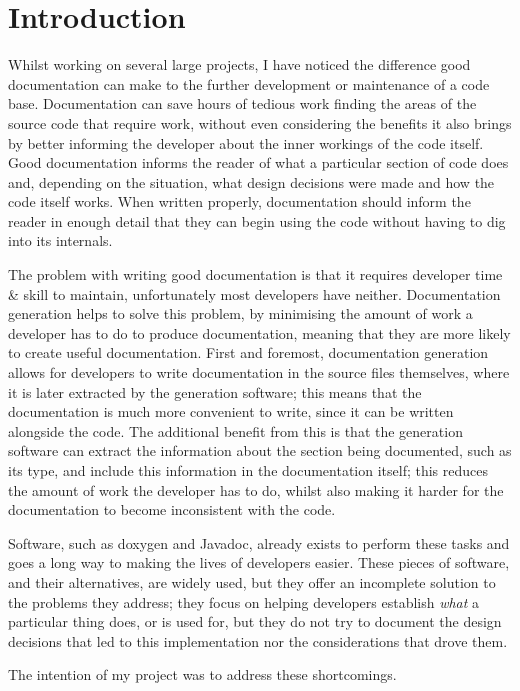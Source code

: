 
\chapter{Introduction}
Whilst working on several large projects, I have noticed the difference good
documentation can make to the further development or maintenance of a code base.
Documentation can save hours of tedious work finding the areas of the source
code that require work, without even considering the benefits it also brings by
better informing the developer about the inner workings of the code itself. Good
documentation informs the reader of what a particular section of code does and,
depending on the situation, what design decisions were made and how the code
itself works. When written properly, documentation should inform the reader in
enough detail that they can begin using the code without having to dig into its
internals.

The problem with writing good documentation is that it requires developer time
\& skill to maintain, unfortunately most developers have neither. Documentation
generation helps to solve this problem, by minimising the amount of work a
developer has to do to produce documentation, meaning that they are more likely
to create useful documentation. First and foremost, documentation generation
allows for developers to write documentation in the source files themselves,
where it is later extracted by the generation software; this means that the
documentation is much more convenient to write, since it can be written
alongside the code. The additional benefit from this is that the generation
software can extract the information about the section being documented, such as
its type, and include this information in the documentation itself; this reduces
the amount of work the developer has to do, whilst also making it harder for the
documentation to become inconsistent with the code.

Software, such as doxygen\cite{website:doxygen} and
Javadoc\cite{website:javadoc}, already exists to perform these tasks and goes a
long way to making the lives of developers easier. These pieces of software, and
their alternatives, are widely used, but they offer an incomplete solution to
the problems they address; they focus on helping developers establish
\emph{what} a particular thing does, or is used for, but they do not try to
document the design decisions that led to this implementation nor the
considerations that drove them.

The intention of my project was to address these shortcomings.
